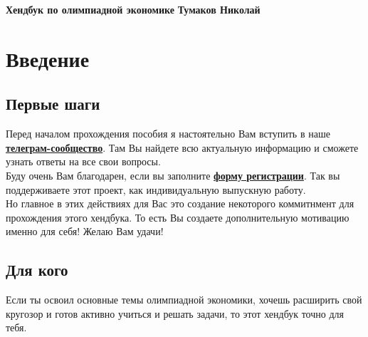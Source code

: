 






\thispagestyle{plain}
\begin{titlepage}
    \hfill\begin{center}
        \begin{tcolorbox}[
            collower=\mycolor{\mycolorlower},
            colupper=\mycolor{\mycolorupper},
            colframe=\mycolor{\mycolorframe},
            colback=\mycolor{\mycolorback},
            fonttitle=\Large\bfseries\centering,
            title=Модель Хотеллинга. Сигналинг. Вертикальная дифференциация товара
        ]
        \large\centering\textbf{Хендбук по олимпиадной экономике}
        \tcblower
        \centering\textbf{Тумаков Николай}
        \end{tcolorbox}
    \end{center}
\end{titlepage}

\restoregeometry

\tableofcontents



\chapter{Введение}


\section{Первые шаги}
\indent\setlength{\parindent}{1em}Перед началом прохождения пособия я настоятельно Вам вступить в наше
\textbf{\href{https://t.me/econ_handbook_screening}{телеграм-сообщество}}. Там Вы найдете всю актуальную информацию и
сможете узнать ответы на все свои вопросы.\\
\indent\setlength{\parindent}{1em}Буду очень Вам благодарен, если вы заполните \textbf{\href{https://forms.gle/bW7CD2zcdUhnbFnR7}{форму регистрации}}. Так вы поддерживаете
этот проект, как индивидуальную выпускную работу.\\
\indent\setlength{\parindent}{1em}Но главное в этих действиях для Вас это создание некоторого коммитнмент для прохождения этого хендбука. То есть Вы создаете дополнительную мотивацию именно для себя! Желаю Вам удачи!

\section{Для кого}
\indent\setlength{\parindent}{1em}Если ты освоил основные темы олимпиадной экономики, хочешь расширить свой кругозор и готов активно учиться и решать задачи, то этот хендбук точно для тебя.

